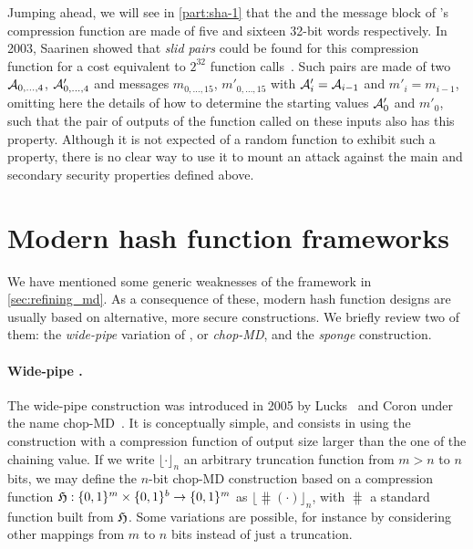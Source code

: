 Jumping ahead, we will see in \autoref{part:sha-1} that the \iv and the message block of \shaone's compression function are made of five and sixteen
32-bit words respectively. In 2003, Saarinen showed that \emph{slid pairs} could be found for this compression function for a cost equivalent to $2^{32}$
function calls~\cite{DBLP:conf/fse/Saarinen03}. Such pairs are made of two \ivs $\mathcal{A}_{0,\ldots,4}$, $\mathcal{A}'_{0,\ldots,4}$ and messages $m_{0,\ldots,15}$,
$m'_{0,\ldots,15}$ with $\mathcal{A}'_i = \mathcal{A}_{i-1}$ and $m'_i = m_{i-1}$, omitting here the details of how to determine the starting values $\mathcal{A}'_0$ and $m'_0$, such that the
pair of outputs of the function called on these inputs also has this property. Although it is not expected of a random function to exhibit such a property, there is no clear way to use it to mount
an attack against the main and secondary security properties defined above.


\section{Modern hash function frameworks}
\label{sec:betterhash}

We have mentioned some generic weaknesses of the \merkdam framework in \autoref{sec:refining_md}. As a consequence of these, modern hash function designs are usually based on alternative,
more secure constructions. We briefly review two of them: the \emph{wide-pipe} variation of \merkdam, or \emph{chop-MD}, and the \emph{sponge} construction.

\paragraph{Wide-pipe \merkdam.} The wide-pipe construction was introduced in 2005 by Lucks~\cite{DBLP:conf/asiacrypt/Lucks05} and Coron \etal under the name chop-MD~\cite{DBLP:conf/crypto/CoronDMP05}.
It is conceptually simple, and consists in using the \merkdam construction with a compression function of output size larger than the one of the chaining value. If we write $\lfloor\cdot\rfloor_n$
an arbitrary truncation function from $m > n$ to $n$ bits, we may define the $n$-bit chop-MD construction based on a compression function $\operatorname{\mathfrak{H}} : \{0,1\}^m \times \{0,1\}^b \rightarrow \{0,1\}^m$
as $\lfloor\hash(\cdot)\rfloor_n$, with $\hash$ a standard \merkdam function built from $\operatorname{\mathfrak{H}}$. Some variations are possible, for instance by considering other mappings from $m$ to $n$
bits instead of just a truncation.

